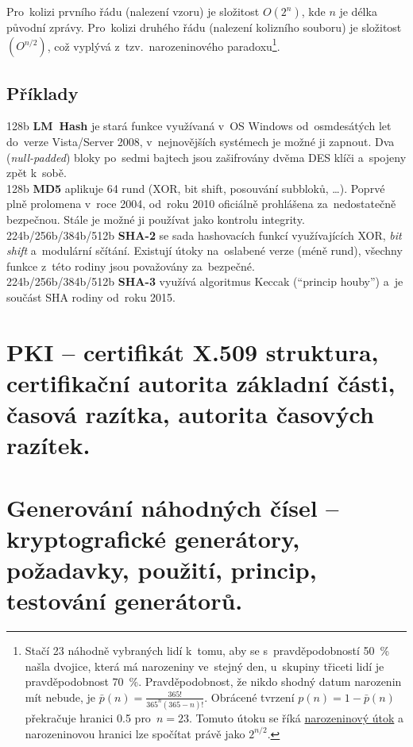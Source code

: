 Pro~kolizi prvního řádu (nalezení vzoru) je složitost $O(2^n)$, kde $n$ je délka původní zprávy. Pro~kolizi druhého řádu (nalezení kolizního souboru) je složitost $(O^{n/2})$, což vyplývá z~tzv.~narozeninového paradoxu\footnote{
Stačí 23 náhodně vybraných lidí k~tomu, aby se s~pravděpodobností 50~\% našla dvojice, která má narozeniny ve~stejný den, u~skupiny třiceti lidí je pravděpodobnost 70~\%. Pravděpodobnost, že nikdo shodný datum narozenin mít nebude, je $\bar{p}(n) = \frac{365!}{365^n(365 - n)!}$. Obrácené tvrzení $p(n) = 1 - \bar{p}(n)$ překračuje hranici 0.5 pro~$n=23$.
Tomuto útoku se říká \href{https://en.wikipedia.org/wiki/Birthday_attack}{narozeninový útok} a narozeninovou hranici lze spočítat právě jako $2^{n/2}$.
}.

\subsection{Příklady}

128b \textbf{LM~Hash} je stará funkce využívaná v~OS Windows od~osmdesátých let do~verze Vista/Server 2008, v~nejnovějších systémech je možné ji zapnout. Dva (\emph{null-padded}) bloky po~sedmi bajtech jsou zašifrovány dvěma DES klíči a~spojeny zpět k~sobě. \\
128b \textbf{MD5} aplikuje 64 rund (XOR, bit shift, posouvání subbloků, \dots). Poprvé plně prolomena v~roce 2004, od~roku 2010 oficiálně prohlášena za~nedostatečně bezpečnou. Stále je možné ji používat jako kontrolu integrity. \\
224b/256b/384b/512b \textbf{SHA-2} se sada hashovacích funkcí využívajících XOR, \emph{bit shift} a~modulární sčítání. Existují útoky na~oslabené verze (méně rund), všechny funkce z~této rodiny jsou považovány za~bezpečné. \\
224b/256b/384b/512b \textbf{SHA-3} využívá algoritmus Keccak (\enquote{princip houby}) a~je součást SHA rodiny od~roku 2015.

\clearpage
\section{PKI -- certifikát X.509 struktura, certifikační autorita základní části, časová razítka, autorita časových razítek.}

\clearpage
\section{Generování náhodných čísel -- kryptografické generátory, požadavky, použití, princip, testování generátorů.}

